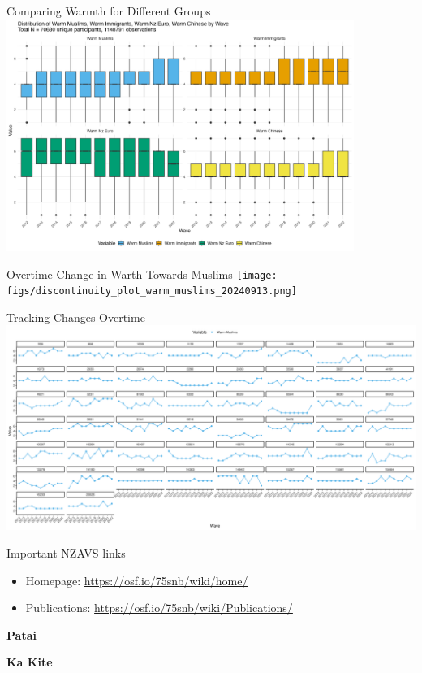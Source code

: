 \documentclass[
  ignorenonframetext,
  aspectratio=169,
]{beamer}
\providecommand{\tightlist}{%
  \setlength{\itemsep}{0pt}\setlength{\parskip}{0pt}}\usepackage{longtable,booktabs,array}
\begin{document}
\begin{frame}{Comparing Warmth for Different Groups}
\label{comparing-warmth-for-different-groups}
\includegraphics[width=0.85\textwidth,height=\textheight]{figs/image002.png}
\end{frame}

\begin{frame}{Overtime Change in Warth Towards Muslims}
\label{overtime-change-in-warth-towards-muslims}
\texttt{[image: figs/discontinuity\_plot\_warm\_muslims\_20240913.png]}
\end{frame}

\begin{frame}{Tracking Changes Overtime}
\label{tracking-changes-overtime}
\includegraphics{figs/seed.png}
\end{frame}

\begin{frame}{Important NZAVS links}
\label{important-nzavs-links}
\begin{itemize}
\tightlist
\item
  Homepage: \url{https://osf.io/75snb/wiki/home/}
\item
  Publications: \url{https://osf.io/75snb/wiki/Publications/}
\end{itemize}
\end{frame}

\begin{frame}
\textbf{Pātai}
\end{frame}

\begin{frame}
\textbf{Ka Kite}
\end{frame}
\end{document}
